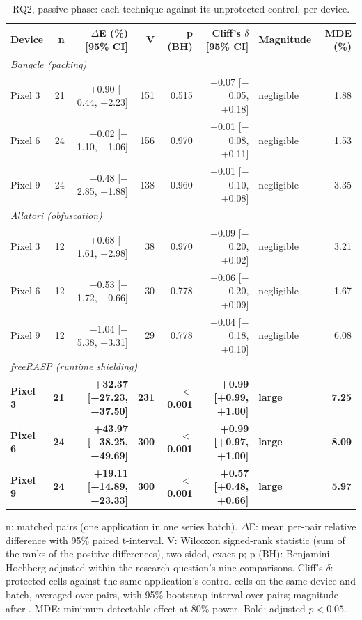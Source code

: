 \begin{table}[t]
\centering
\small
\caption{RQ2, passive phase: each technique against its unprotected control, per device.}
\label{tab:rq2}
\begin{tabular}{lrrrrrlr}
\toprule
\textbf{Device} & \textbf{n} & \textbf{$\Delta$E (\%) [95\% CI]} & \textbf{V} & \textbf{p (BH)} & \textbf{Cliff's $\delta$ [95\% CI]} & \textbf{Magnitude} & \textbf{MDE (\%)} \\
\midrule
\multicolumn{8}{l}{\textit{Bangcle (packing)}} \\
Pixel 3 & 21 & +0.90 [$-$0.44, +2.23] & 151 & 0.515 & +0.07 [$-$0.05, +0.18] & negligible & 1.88 \\
Pixel 6 & 24 & $-$0.02 [$-$1.10, +1.06] & 156 & 0.970 & +0.01 [$-$0.08, +0.11] & negligible & 1.53 \\
Pixel 9 & 24 & $-$0.48 [$-$2.85, +1.88] & 138 & 0.960 & $-$0.01 [$-$0.10, +0.08] & negligible & 3.35 \\
\midrule
\multicolumn{8}{l}{\textit{Allatori (obfuscation)}} \\
Pixel 3 & 12 & +0.68 [$-$1.61, +2.98] & 38 & 0.970 & $-$0.09 [$-$0.20, +0.02] & negligible & 3.21 \\
Pixel 6 & 12 & $-$0.53 [$-$1.72, +0.66] & 30 & 0.778 & $-$0.06 [$-$0.20, +0.09] & negligible & 1.67 \\
Pixel 9 & 12 & $-$1.04 [$-$5.38, +3.31] & 29 & 0.778 & $-$0.04 [$-$0.18, +0.10] & negligible & 6.08 \\
\midrule
\multicolumn{8}{l}{\textit{freeRASP (runtime shielding)}} \\
\textbf{Pixel 3} & \textbf{21} & \textbf{+32.37 [+27.23, +37.50]} & \textbf{231} & \textbf{$<$ 0.001} & \textbf{+0.99 [+0.99, +1.00]} & \textbf{large} & \textbf{7.25} \\
\textbf{Pixel 6} & \textbf{24} & \textbf{+43.97 [+38.25, +49.69]} & \textbf{300} & \textbf{$<$ 0.001} & \textbf{+0.99 [+0.97, +1.00]} & \textbf{large} & \textbf{8.09} \\
\textbf{Pixel 9} & \textbf{24} & \textbf{+19.11 [+14.89, +23.33]} & \textbf{300} & \textbf{$<$ 0.001} & \textbf{+0.57 [+0.48, +0.66]} & \textbf{large} & \textbf{5.97} \\
\bottomrule
\end{tabular}
\par\smallskip\footnotesize n: matched pairs (one application in one series batch). $\Delta$E: mean per-pair relative difference with 95\% paired t-interval. V: Wilcoxon signed-rank statistic (sum of the ranks of the positive differences), two-sided, exact p; p (BH): Benjamini-Hochberg adjusted within the research question's nine comparisons. Cliff's $\delta$: protected cells against the same application's control cells on the same device and batch, averaged over pairs, with 95\% bootstrap interval over pairs; magnitude after \cite{romano2006cliff}. MDE: minimum detectable effect at 80\% power. Bold: adjusted $p < 0.05$.
\end{table}
